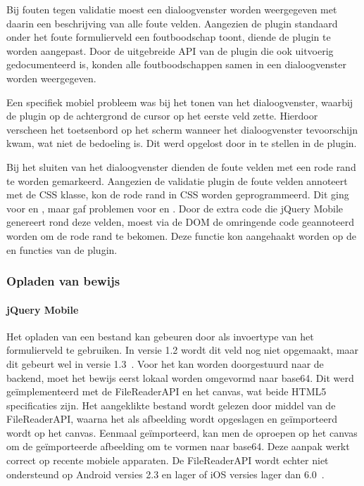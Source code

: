 Bij fouten tegen validatie moest een dialoogvenster worden weergegeven met daarin een beschrijving van alle foute velden.
Aangezien de plugin standaard onder het foute formulierveld een foutboodschap toont, diende de plugin  te worden aangepast.
Door de uitgebreide API van de plugin die ook uitvoerig gedocumenteerd is, konden alle foutboodschappen samen in een dialoogvenster worden weergegeven.

Een specifiek mobiel probleem was bij het tonen van het dialoogvenster, waarbij de plugin op de achtergrond de cursor op het eerste veld zette. 
Hierdoor verscheen het toetsenbord op het scherm wanneer het dialoogvenster tevoorschijn kwam, wat niet de bedoeling is. 
Dit werd opgelost door  in te stellen in de plugin.

Bij het sluiten van het dialoogvenster dienden de foute velden met een rode rand te worden gemarkeerd.
Aangezien de validatie plugin de foute velden annoteert met de  CSS klasse, kon de rode rand in CSS worden geprogrammeerd. 
Dit ging voor  en , maar gaf problemen voor  en .
Door de extra code die jQuery Mobile genereert rond deze velden, moest via de DOM de omringende code geannoteerd worden om de rode rand te bekomen. 
Deze functie kon aangehaakt worden op de  en  functies van de plugin.

\subsubsection{Opladen van bewijs}

\paragraph{jQuery Mobile} 
Het opladen van een bestand kan gebeuren door  als invoertype van het formulierveld te gebruiken. In versie 1.2 wordt dit veld nog niet opgemaakt, maar dit gebeurt wel in versie 1.3~\cite{JQuery2013d}. Voor het kan worden doorgestuurd naar de backend, moet het bewijs eerst lokaal worden omgevormd naar base64. Dit werd geïmplementeerd met de FileReaderAPI en het canvas, wat beide HTML5 specificaties zijn. Het aangeklikte bestand wordt gelezen door middel van de FileReaderAPI, waarna het als afbeelding wordt opgeslagen en geïmporteerd wordt op het canvas. Eenmaal geïmporteerd, kan men de  oproepen op het canvas om de geïmporteerde afbeelding om te vormen naar base64. Deze aanpak werkt correct op recente mobiele apparaten. De FileReaderAPI wordt echter niet ondersteund op Android versies 2.3 en lager of iOS versies lager dan 6.0~\cite{Deveria2013a}.

